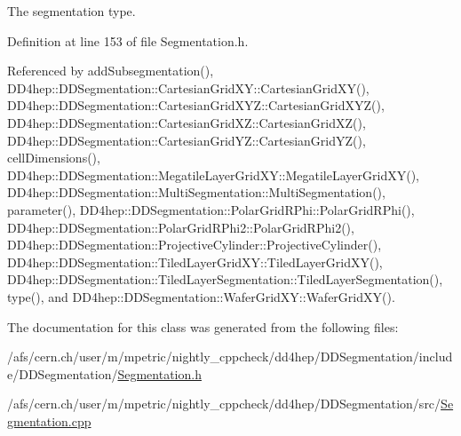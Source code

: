 The segmentation type. 

Definition at line 153 of file Segmentation.h.

Referenced by addSubsegmentation(), DD4hep::DDSegmentation::CartesianGridXY::CartesianGridXY(), DD4hep::DDSegmentation::CartesianGridXYZ::CartesianGridXYZ(), DD4hep::DDSegmentation::CartesianGridXZ::CartesianGridXZ(), DD4hep::DDSegmentation::CartesianGridYZ::CartesianGridYZ(), cellDimensions(), DD4hep::DDSegmentation::MegatileLayerGridXY::MegatileLayerGridXY(), DD4hep::DDSegmentation::MultiSegmentation::MultiSegmentation(), parameter(), DD4hep::DDSegmentation::PolarGridRPhi::PolarGridRPhi(), DD4hep::DDSegmentation::PolarGridRPhi2::PolarGridRPhi2(), DD4hep::DDSegmentation::ProjectiveCylinder::ProjectiveCylinder(), DD4hep::DDSegmentation::TiledLayerGridXY::TiledLayerGridXY(), DD4hep::DDSegmentation::TiledLayerSegmentation::TiledLayerSegmentation(), type(), and DD4hep::DDSegmentation::WaferGridXY::WaferGridXY().

The documentation for this class was generated from the following files:\begin{DoxyCompactItemize}
\item 
/afs/cern.ch/user/m/mpetric/nightly\_\-cppcheck/dd4hep/DDSegmentation/include/DDSegmentation/\hyperlink{_segmentation_8h}{Segmentation.h}\item 
/afs/cern.ch/user/m/mpetric/nightly\_\-cppcheck/dd4hep/DDSegmentation/src/\hyperlink{_segmentation_8cpp}{Segmentation.cpp}\end{DoxyCompactItemize}
